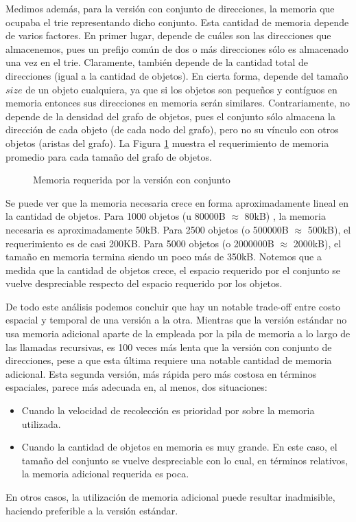 Medimos además, para la versión con conjunto de direcciones, la memoria que ocupaba el trie representando dicho conjunto. Esta cantidad de memoria depende de varios factores. En primer lugar, depende de cuáles son las direcciones que almacenemos, pues un prefijo común de dos o más direcciones sólo es almacenado una vez en el trie. Claramente, también depende de la cantidad total de direcciones (igual a la cantidad de objetos). En cierta forma, depende del tamaño $size$ de un objeto cualquiera, ya que si los objetos son pequeños y contíguos en memoria entonces sus direcciones en memoria serán similares. Contrariamente, no depende de la densidad del grafo de objetos, pues el conjunto sólo almacena la dirección de cada objeto (de cada nodo del grafo), pero no su vínculo con otros objetos (aristas del grafo). La Figura \ref{fig:memoria} muestra el requerimiento de memoria promedio para cada tamaño del grafo de objetos.

\begin{figure}[H]
\centering

\caption{Memoria requerida por la versión con conjunto}
\label{fig:memoria}
\end{figure}

Se puede ver que la memoria necesaria crece en forma aproximadamente lineal en la cantidad de objetos. Para 1000 objetos (u 80000B $\approx$ 80kB) , la memoria necesaria es aproximadamente 50kB. Para 2500 objetos (o 500000B $\approx$ 500kB), el requerimiento es de casi 200KB. Para 5000 objetos (o 2000000B $\approx$ 2000kB), el tamaño en memoria termina siendo un poco más de 350kB. Notemos que a medida que la cantidad de objetos crece, el espacio requerido por el conjunto se vuelve despreciable respecto del espacio requerido por los objetos.

De todo este análisis podemos concluir que hay un notable trade-off entre costo espacial y temporal de una versión a la otra. Mientras que la versión estándar no usa memoria adicional aparte de la empleada por la pila de memoria a lo largo de las llamadas recursivas, es 100 veces más lenta que la versión con conjunto de direcciones, pese a que esta última requiere una notable cantidad de memoria adicional. Esta segunda versión, más rápida pero más costosa en términos espaciales, parece más adecuada en, al menos, dos situaciones:

\begin{itemize}
\item Cuando la velocidad de recolección es prioridad por sobre la memoria utilizada.

\item Cuando la cantidad de objetos en memoria es muy grande. En este caso, el tamaño del conjunto se vuelve despreciable con lo cual, en términos relativos, la memoria adicional requerida es poca.
\end{itemize}

En otros casos, la utilización de memoria adicional puede resultar inadmisible, haciendo preferible a la versión estándar.